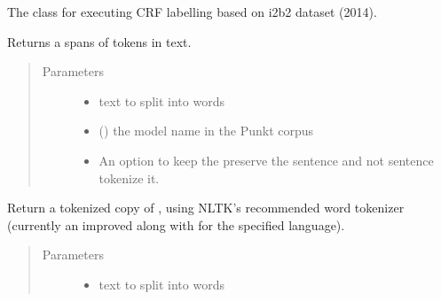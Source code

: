\documentclass[letterpaper,10pt,english]{sphinxmanual}
\begin{document}
\begin{fulllineitems}
\label{\detokenize{index:ner_plugins.NER_CRF.NER_CRF}}
The class for executing CRF labelling based on i2b2 dataset (2014).

\begin{fulllineitems}
\label{\detokenize{index:ner_plugins.NER_CRF.NER_CRF.custom_span_tokenize}}
Returns a spans of tokens in text.
\begin{quote}\begin{description}
\item[{Parameters}] \leavevmode\begin{itemize}
\item {} 
 \textendash{} text to split into words

\item {} 
 () \textendash{} the model name in the Punkt corpus

\item {} 
 \textendash{} An option to keep the preserve the sentence and not sentence tokenize it.

\end{itemize}

\end{description}\end{quote}

\end{fulllineitems}


\begin{fulllineitems}
\label{\detokenize{index:ner_plugins.NER_CRF.NER_CRF.custom_word_tokenize}}
Return a tokenized copy of ,
using NLTK’s recommended word tokenizer
(currently an improved 
along with 
for the specified language).
\begin{quote}\begin{description}
\item[{Parameters}] \leavevmode\begin{itemize}
\item {} 
 \textendash{} text to split into words


\end{itemize}
\end{description}
\end{quote}
\end{fulllineitems}
\end{fulllineitems}
\end{document}
